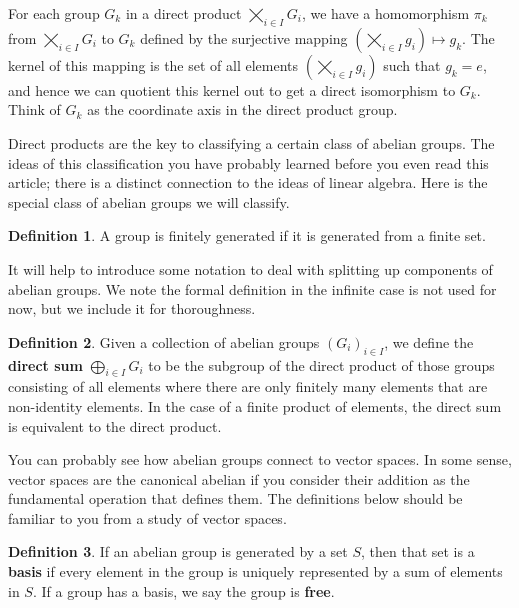 \documentclass[12pt]{amsbook}
\theoremstyle{definition}
\newtheorem{definition}{Definition}
\begin{document}
For each group $G_k$ in a direct product $\bigtimes_{i \in I} G_i$, we have a homomorphism $\pi_k$ from $\bigtimes_{i \in I} G_i$ to $G_k$ defined by the surjective mapping $(\bigtimes_{i \in I} g_i) \mapsto g_k$. The kernel of this mapping is the set of all elements $(\bigtimes_{i \in I} g_i)$ such that $g_k = e$, and hence we can quotient this kernel out to get a direct isomorphism to $G_k$. Think of $G_k$ as the coordinate axis in the direct product group.

Direct products are the key to classifying a certain class of abelian groups. The ideas of this classification you have probably learned before you even read this article; there is a distinct connection to the ideas of linear algebra. Here is the special class of abelian groups we will classify.

\begin{definition}
    A group is finitely generated if it is generated from a finite set.
\end{definition}

It will help to introduce some notation to deal with splitting up components of abelian groups. We note the formal definition in the infinite case is not used for now, but we include it for thoroughness.

\begin{definition}
    Given a collection of abelian groups $(G_i)_{i \in I}$, we define the {\bf direct sum} $\bigoplus_{i \in I} G_i$ to be the subgroup of the direct product of those groups consisting of all elements where there are only finitely many elements that are non-identity elements. In the case of a finite product of elements, the direct sum is equivalent to the direct product.
\end{definition}

You can probably see how abelian groups connect to vector spaces. In some sense, vector spaces are the canonical abelian if you consider their addition as the fundamental operation that defines them. The definitions below should be familiar to you from a study of vector spaces.

\begin{definition}
    If an abelian group is generated by a set $S$, then that set is a {\bf basis} if every element in the group is uniquely represented by a sum of elements in $S$. If a group has a basis, we say the group is {\bf free}.
\end{definition}
\end{document}
